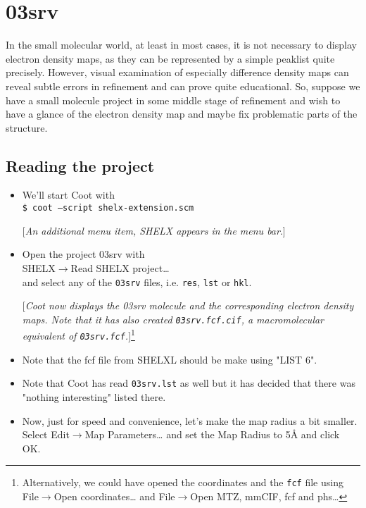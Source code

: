 \documentclass{article}
\begin{document}
\section{03srv}

In the small molecular world, at least in most cases, it is not
necessary to display electron density maps, as they can be represented
by a simple peaklist quite precisely. However, visual examination of
especially difference density maps can reveal subtle errors in
refinement and can prove quite educational. So, suppose we have a
small molecule project in some middle stage of refinement and wish to
have a glance of the electron density map and maybe fix problematic
parts of the structure.

\subsection{Reading the project}
\begin{itemize}
\item We'll start Coot with\\\texttt{\$ coot --script shelx-extension.scm}

  [\textsl{An additional menu item, SHELX appears in the menu bar}.]

\item Open the project 03srv with\\\textsf{SHELX$\to$Read SHELX
    project\ldots}\\and select any of the \texttt{03srv} files, i.e.
  \texttt{res}, \texttt{lst} or \texttt{hkl}.

  [\textsl{Coot now displays the 03srv molecule and the corresponding
    electron density maps. Note that it has also created
    \texttt{03srv.fcf.cif}, a macromolecular equivalent of
    \texttt{03srv.fcf}.}]\footnote{Alternatively, we could have opened
    the coordinates and the \texttt{fcf} file
    using\\\textsf{File$\to$Open coordinates\ldots} and
    \textsf{File$\to$Open MTZ, mmCIF, fcf and phs\ldots}}

\item Note that the fcf file from SHELXL should be make using "LIST
  6".

\item Note that Coot has read \texttt{03srv.lst} as well but it has
  decided that there was "nothing interesting" listed there.

\item Now, just for speed and convenience, let's make the map radius a
  bit smaller. Select \textsf{Edit$\to$Map Parameters\ldots} and set
  the Map Radius to 5{\AA} and click \textsf{OK}.
\end{itemize}
\end{document}
